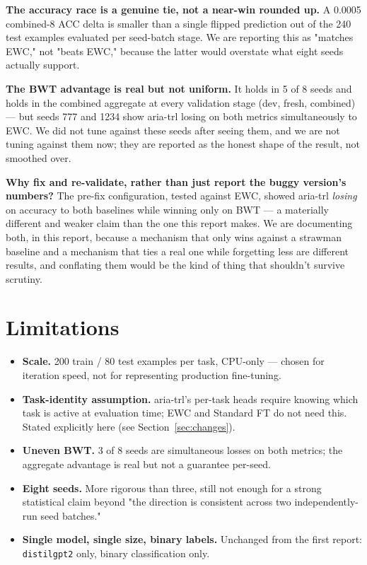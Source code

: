 \documentclass[10pt,twocolumn]{article}
\begin{document}
\textbf{The accuracy race is a genuine tie, not a near-win rounded up.} A
0.0005 combined-8 ACC delta is smaller than a single flipped prediction out
of the 240 test examples evaluated per seed-batch stage. We are reporting
this as "matches EWC," not "beats EWC," because the latter would overstate
what eight seeds actually support.

\textbf{The BWT advantage is real but not uniform.} It holds in 5 of 8 seeds
and holds in the combined aggregate at every validation stage (dev, fresh,
combined) — but seeds 777 and 1234 show aria-trl losing on both metrics
simultaneously to EWC. We did not tune against these seeds after seeing
them, and we are not tuning against them now; they are reported as the
honest shape of the result, not smoothed over.

\textbf{Why fix and re-validate, rather than just report the buggy
version's numbers?} The pre-fix configuration, tested against EWC, showed
aria-trl \emph{losing} on accuracy to both baselines while winning only on
BWT — a materially different and weaker claim than the one this report
makes. We are documenting both, in this report, because a mechanism that
only wins against a strawman baseline and a mechanism that ties a real one
while forgetting less are different results, and conflating them would be
the kind of thing that shouldn't survive scrutiny.

\section{Limitations}

\begin{itemize}
\item \textbf{Scale.} 200 train / 80 test examples per task, CPU-only —
  chosen for iteration speed, not for representing production fine-tuning.
\item \textbf{Task-identity assumption.} aria-trl's per-task heads require
  knowing which task is active at evaluation time; EWC and Standard FT do
  not need this. Stated explicitly here (see Section~\ref{sec:changes}).
\item \textbf{Uneven BWT.} 3 of 8 seeds are simultaneous losses on both
  metrics; the aggregate advantage is real but not a guarantee per-seed.
\item \textbf{Eight seeds.} More rigorous than three, still not enough for
  a strong statistical claim beyond "the direction is consistent across two
  independently-run seed batches."
\item \textbf{Single model, single size, binary labels.} Unchanged from the
  first report: \texttt{distilgpt2} only, binary classification only.
\end{itemize}
\end{document}
